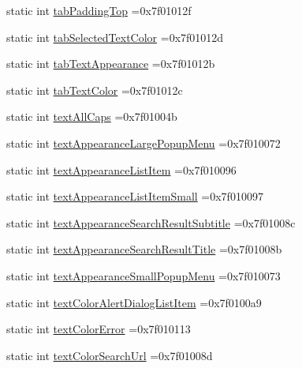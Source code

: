 \begin{DoxyCompactItemize}
\item 
static int \hyperlink{classandroid_1_1support_1_1v4_1_1R_1_1attr_a52d18671529e90af8baacabe3fb145f5}{tab\+Padding\+Top} =0x7f01012f
\item 
static int \hyperlink{classandroid_1_1support_1_1v4_1_1R_1_1attr_a785cc6ac834de1b16151d47714ba0b08}{tab\+Selected\+Text\+Color} =0x7f01012d
\item 
static int \hyperlink{classandroid_1_1support_1_1v4_1_1R_1_1attr_a24a6389980f226da2272d93c69206a1a}{tab\+Text\+Appearance} =0x7f01012b
\item 
static int \hyperlink{classandroid_1_1support_1_1v4_1_1R_1_1attr_af9f7d1989e331de9a1ba5e3e353335ad}{tab\+Text\+Color} =0x7f01012c
\item 
static int \hyperlink{classandroid_1_1support_1_1v4_1_1R_1_1attr_af49e1396fa93fb3c916d95b6b825adf7}{text\+All\+Caps} =0x7f01004b
\item 
static int \hyperlink{classandroid_1_1support_1_1v4_1_1R_1_1attr_ac95ce759329fc855718c6b3a61a764d8}{text\+Appearance\+Large\+Popup\+Menu} =0x7f010072
\item 
static int \hyperlink{classandroid_1_1support_1_1v4_1_1R_1_1attr_aa6652e8f8f1055a205e3cf8a931aa2ef}{text\+Appearance\+List\+Item} =0x7f010096
\item 
static int \hyperlink{classandroid_1_1support_1_1v4_1_1R_1_1attr_a29c6c481b3ead94f36b0ffc18e7bc247}{text\+Appearance\+List\+Item\+Small} =0x7f010097
\item 
static int \hyperlink{classandroid_1_1support_1_1v4_1_1R_1_1attr_ab65ed23c9eed16cf42d91ea4e8e70946}{text\+Appearance\+Search\+Result\+Subtitle} =0x7f01008c
\item 
static int \hyperlink{classandroid_1_1support_1_1v4_1_1R_1_1attr_a4b4c9e0256dc86743a3c07371ce817bd}{text\+Appearance\+Search\+Result\+Title} =0x7f01008b
\item 
static int \hyperlink{classandroid_1_1support_1_1v4_1_1R_1_1attr_aac7597ce08870b189e08a6fdb490bccf}{text\+Appearance\+Small\+Popup\+Menu} =0x7f010073
\item 
static int \hyperlink{classandroid_1_1support_1_1v4_1_1R_1_1attr_a03a5e3e3dd99d4e3da661dc7f6c22b3a}{text\+Color\+Alert\+Dialog\+List\+Item} =0x7f0100a9
\item 
static int \hyperlink{classandroid_1_1support_1_1v4_1_1R_1_1attr_aef1b465301aac63a751d46963c485c84}{text\+Color\+Error} =0x7f010113
\item 
static int \hyperlink{classandroid_1_1support_1_1v4_1_1R_1_1attr_a3dce28340c463d79b7547b6bac8e41cd}{text\+Color\+Search\+Url} =0x7f01008d

\end{DoxyCompactItemize}
